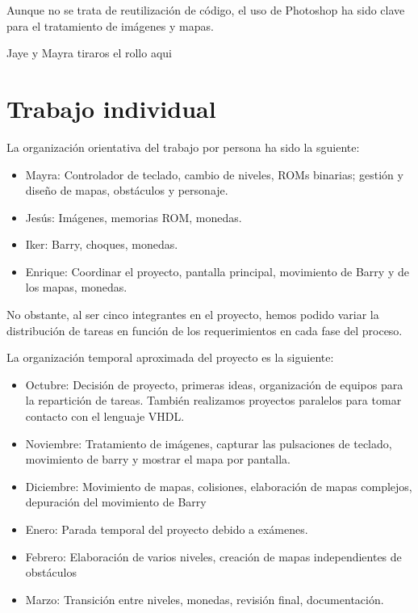 \documentclass[11pt, a4paper, spanish, openright, twoside]{book}
\begin{document}
Aunque no se trata de reutilización de código, el uso de Photoshop ha sido clave para el tratamiento de imágenes y mapas.

Jaye y Mayra tiraros el rollo aqui



\section{Trabajo individual}
La organización orientativa del trabajo por persona ha sido la sguiente:
\begin{itemize}
item Jaime: controlador de teclado, cambio de niveles, movimiento de Barry, gestión y diseño de mapas.
\item Mayra: Controlador de teclado,  cambio de niveles, ROMs binarias; gestión y diseño de mapas, obstáculos y personaje.
\item Jesús: Imágenes, memorias ROM, monedas.
\item Iker: Barry, choques, monedas.
\item Enrique: Coordinar el proyecto, pantalla principal, movimiento de Barry y de los mapas, monedas.
\end{itemize}
No obstante, al ser cinco integrantes en el proyecto, hemos podido variar la distribución de tareas en función de los requerimientos en cada fase del proceso. 

La organización temporal aproximada del proyecto es la siguiente:
\begin{itemize}
\item Octubre: Decisión de proyecto, primeras ideas, organización de equipos para la repartición de tareas. También realizamos proyectos paralelos para tomar contacto con el lenguaje VHDL.
\item Noviembre: Tratamiento de imágenes, capturar las pulsaciones de teclado, movimiento de barry y mostrar el mapa por pantalla.
\item Diciembre: Movimiento de mapas, colisiones, elaboración de mapas complejos, depuración del movimiento de Barry
\item Enero: Parada temporal del proyecto debido a exámenes.
\item Febrero: Elaboración de varios niveles, creación de mapas independientes de obstáculos
\item Marzo: Transición entre niveles, monedas, revisión final, documentación.
\end{itemize}
\end{document}
